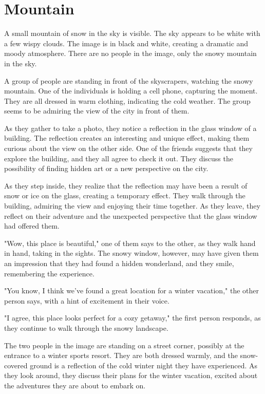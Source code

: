 \documentclass[smalldemyvopaper,11pt,twoside,onecolumn,openright,extrafontsizes]{memoir}
\begin{document}
\chapter{Mountain}
A small mountain of snow in the sky is visible. The sky appears to be white with a few wispy clouds. The image is in black and white, creating a dramatic and moody atmosphere. There are no people in the image, only the snowy mountain in the sky.\par
A group of people are standing in front of the skyscrapers, watching the snowy mountain. One of the individuals is holding a cell phone, capturing the moment. They are all dressed in warm clothing, indicating the cold weather. The group seems to be admiring the view of the city in front of them.\par
As they gather to take a photo, they notice a reflection in the glass window of a building. The reflection creates an interesting and unique effect, making them curious about the view on the other side. One of the friends suggests that they explore the building, and they all agree to check it out. They discuss the possibility of finding hidden art or a new perspective on the city.\par
As they step inside, they realize that the reflection may have been a result of snow or ice on the glass, creating a temporary effect. They walk through the building, admiring the view and enjoying their time together. As they leave, they reflect on their adventure and the unexpected perspective that the glass window had offered them.\par
"Wow, this place is beautiful," one of them says to the other, as they walk hand in hand, taking in the sights. The snowy window, however, may have given them an impression that they had found a hidden wonderland, and they smile, remembering the experience.\par
"You know, I think we've found a great location for a winter vacation," the other person says, with a hint of excitement in their voice.\par
"I agree, this place looks perfect for a cozy getaway," the first person responds, as they continue to walk through the snowy landscape.\par
The two people in the image are standing on a street corner, possibly at the entrance to a winter sports resort. They are both dressed warmly, and the snow-covered ground is a reflection of the cold winter night they have experienced. As they look around, they discuss their plans for the winter vacation, excited about the adventures they are about to embark on.\par
\end{document}
